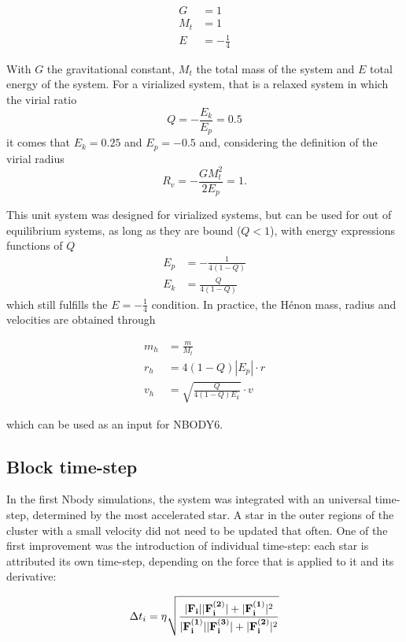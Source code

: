 \begin{align}
G &= 1\\
M_t &= 1\\
E &= -\frac{1}{4}
\end{align}

With $G$ the gravitational constant, $M_t$ the total mass of the system and $E$ total energy of the system. For a virialized system, that is a relaxed system in which the virial ratio 
\begin{equation}
Q = - \frac{E_k}{E_p} = 0.5
\end{equation}
it comes that $E_k=0.25$ and $E_p = -0.5$ and, considering the definition of the virial radius 
\begin{equation}
R_v = - \frac{G M_t^2}{2 E_p} = 1.
\end{equation} 

This unit system was designed for virialized systems, but can be used for out of equilibrium systems, as long as they are bound ($Q <1$), with energy expressions functions of $Q$
\begin{align}
E_p  &= - \frac{1}{4(1-Q)}\\
E_k &= \frac{Q}{4(1-Q)}
\end{align}
which still fulfills the $E = -\frac{1}{4}$ condition. In practice, the H\'enon mass, radius and velocities are obtained through

\begin{align}
m_h &= \frac{m}{M_t}\\
r_h &= 4 (1-Q) |E_p| \cdot r\\
v_h &= \sqrt{ \frac{Q}{4(1-Q) E_k} } \cdot v
\end{align}

which can be used as an input for NBODY6.
\subsection{Block time-step}
 
In the first Nbody simulations, the system was integrated with an universal time-step, determined by the most accelerated star. A star in the outer regions of the cluster with a small velocity did not need to be updated that often. One of the first improvement  was the introduction of individual time-step: each star is attributed its own time-step, depending on the force that is applied to it and its derivative:

\begin{equation}
\label{Eq:0_timestep}
\Delta t_i =  \eta \sqrt{\frac{ |\bold{F_i}||\bold{F^{(2)}_i}| + |\bold{F^{(1)}_i}|^2 }{|\bold{F^{(1)}_i}||\bold{F^{(3)}_i}| + |\bold{F^{(2)}_i}|^2}}
\end{equation}
 
